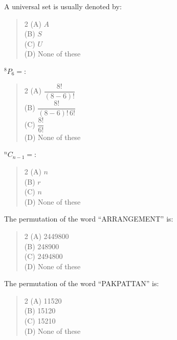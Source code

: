 \documentclass[11pt,a4paper]{article}
\begin{document}
\begin{mcqlist}
\item A universal set is usually denoted by:
\begin{quote}\begin{multicols}{2}
\noindent (A) $A$ \\
(B) $S$ \\
(C) $U$ \\
(D) None of these
\end{multicols}\end{quote}

\item ${}^{8}P_6=$\underline{\hspace{1cm}}:
\begin{quote}\begin{multicols}{2}
\noindent (A) $\dfrac{8!}{(8-6)!}$ \\
(B) $\dfrac{8!}{(8-6)!\,6!}$ \\
(C) $\dfrac{8!}{6!}$ \\
(D) None of these
\end{multicols}\end{quote}

\item ${}^{n}C_{n-1}=$\underline{\hspace{1cm}}:
\begin{quote}\begin{multicols}{2}
\noindent (A) $n$ \\
(B) $r$ \\
(C) $n$ \\
(D) None of these
\end{multicols}\end{quote}

\item The permutation of the word ``ARRANGEMENT'' is:
\begin{quote}\begin{multicols}{2}
\noindent (A) 2449800 \\
(B) 248900 \\
(C) 2494800 \\
(D) None of these
\end{multicols}\end{quote}

\item The permutation of the word ``PAKPATTAN'' is:
\begin{quote}\begin{multicols}{2}
\noindent (A) 11520 \\
(B) 15120 \\
(C) 15210 \\
(D) None of these
\end{multicols}\end{quote}


\end{mcqlist}
\end{document}
